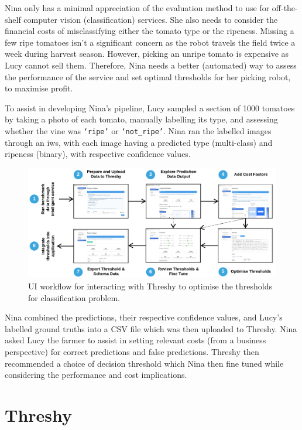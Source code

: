 Nina only has a minimal appreciation of the evaluation method to use for off-the-shelf computer vision (classification) services. She also needs to consider the financial costs of misclassifying either the tomato type or the ripeness. Missing a few ripe tomatoes isn't a significant concern as the robot travels the field twice a week during harvest season. However, picking an unripe tomato is expensive as Lucy cannot sell them. Therefore, Nina needs a better (automated) way to assess the performance of the service and set optimal thresholds for her picking robot, to maximise profit.

To assist in developing Nina's pipeline, Lucy sampled a section of 1000 tomatoes by taking a photo of each tomato, manually labelling its type, and assessing whether the vine was  \texttt{`ripe'} or \texttt{`not\_ripe'}. Nina ran the labelled images through an \gls{iws}, with each image having a predicted type (multi-class) and ripeness (binary), with respective confidence values. 

\begin{figure}[t!]
    \centering
    \includegraphics[width=\linewidth]{workflow}
    \caption{UI workflow for interacting with Threshy to optimise the thresholds for classification problem.}
    \label{fig:workflow}
\end{figure}

Nina combined the predictions, their respective confidence values, and Lucy's labelled ground truths into a CSV file which was then uploaded to Threshy. Nina asked Lucy the farmer to assist in setting relevant costs (from a business perspective) for correct predictions and false predictions. Threshy then recommended a choice of decision threshold which Nina then fine tuned while considering the performance and cost implications. 

\section{Threshy}
\label{sec:threshy}

